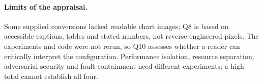 \paragraph{Limits of the appraisal.} Some supplied conversions lacked readable chart images; Q8 is based on accessible captions, tables and stated numbers, not reverse-engineered pixels. The experiments and code were not rerun, so Q10 assesses whether a reader can critically interpret the configuration. Performance isolation, resource separation, adversarial security and fault containment need different experiments; a high total cannot establish all four. 
